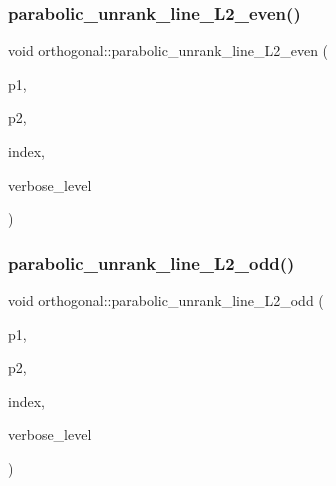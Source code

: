 \subsubsection{\texorpdfstring{parabolic\+\_\+unrank\+\_\+line\+\_\+\+L2\+\_\+even()}{parabolic\_unrank\_line\_L2\_even()}}
{\footnotesize\ttfamily void orthogonal\+::parabolic\+\_\+unrank\+\_\+line\+\_\+\+L2\+\_\+even (\begin{DoxyParamCaption}\item[{\mbox{\hyperlink{galois_8h_a09fddde158a3a20bd2dcadb609de11dc}{I\+NT}} \&}]{p1,  }\item[{\mbox{\hyperlink{galois_8h_a09fddde158a3a20bd2dcadb609de11dc}{I\+NT}} \&}]{p2,  }\item[{\mbox{\hyperlink{galois_8h_a09fddde158a3a20bd2dcadb609de11dc}{I\+NT}}}]{index,  }\item[{\mbox{\hyperlink{galois_8h_a09fddde158a3a20bd2dcadb609de11dc}{I\+NT}}}]{verbose\+\_\+level }\end{DoxyParamCaption})}

\mbox{\label{classorthogonal_a9ab8a29daee27c60803e2bf5026a9a9e}} 
\subsubsection{\texorpdfstring{parabolic\+\_\+unrank\+\_\+line\+\_\+\+L2\+\_\+odd()}{parabolic\_unrank\_line\_L2\_odd()}}
{\footnotesize\ttfamily void orthogonal\+::parabolic\+\_\+unrank\+\_\+line\+\_\+\+L2\+\_\+odd (\begin{DoxyParamCaption}\item[{\mbox{\hyperlink{galois_8h_a09fddde158a3a20bd2dcadb609de11dc}{I\+NT}} \&}]{p1,  }\item[{\mbox{\hyperlink{galois_8h_a09fddde158a3a20bd2dcadb609de11dc}{I\+NT}} \&}]{p2,  }\item[{\mbox{\hyperlink{galois_8h_a09fddde158a3a20bd2dcadb609de11dc}{I\+NT}}}]{index,  }\item[{\mbox{\hyperlink{galois_8h_a09fddde158a3a20bd2dcadb609de11dc}{I\+NT}}}]{verbose\+\_\+level }\end{DoxyParamCaption})}

\mbox{\label{classorthogonal_ae1edfba289a03ed4d383514c2b0dc4b7}} 
